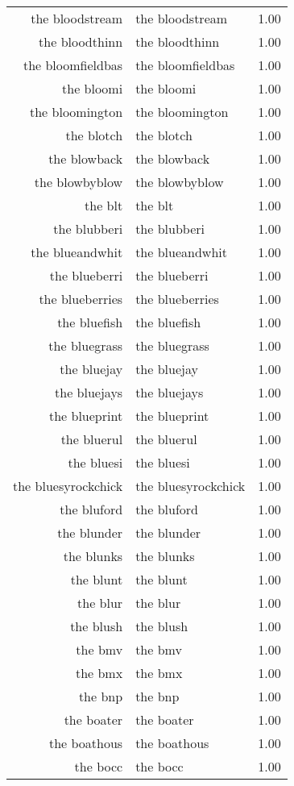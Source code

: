 \begin{table}[ht]
\begin{tabular}{rlr}
  the bloodstream & the bloodstream & 1.00 \\ 
  the bloodthinn & the bloodthinn & 1.00 \\ 
  the bloomfieldbas & the bloomfieldbas & 1.00 \\ 
  the bloomi & the bloomi & 1.00 \\ 
  the bloomington & the bloomington & 1.00 \\ 
  the blotch & the blotch & 1.00 \\ 
  the blowback & the blowback & 1.00 \\ 
  the blowbyblow & the blowbyblow & 1.00 \\ 
  the blt & the blt & 1.00 \\ 
  the blubberi & the blubberi & 1.00 \\ 
  the blueandwhit & the blueandwhit & 1.00 \\ 
  the blueberri & the blueberri & 1.00 \\ 
  the blueberries & the blueberries & 1.00 \\ 
  the bluefish & the bluefish & 1.00 \\ 
  the bluegrass & the bluegrass & 1.00 \\ 
  the bluejay & the bluejay & 1.00 \\ 
  the bluejays & the bluejays & 1.00 \\ 
  the blueprint & the blueprint & 1.00 \\ 
  the bluerul & the bluerul & 1.00 \\ 
  the bluesi & the bluesi & 1.00 \\ 
  the bluesyrockchick & the bluesyrockchick & 1.00 \\ 
  the bluford & the bluford & 1.00 \\ 
  the blunder & the blunder & 1.00 \\ 
  the blunks & the blunks & 1.00 \\ 
  the blunt & the blunt & 1.00 \\ 
  the blur & the blur & 1.00 \\ 
  the blush & the blush & 1.00 \\ 
  the bmv & the bmv & 1.00 \\ 
  the bmx & the bmx & 1.00 \\ 
  the bnp & the bnp & 1.00 \\ 
  the boater & the boater & 1.00 \\ 
  the boathous & the boathous & 1.00 \\ 
  the bocc & the bocc & 1.00 \\ 

\end{tabular}
\end{table}
